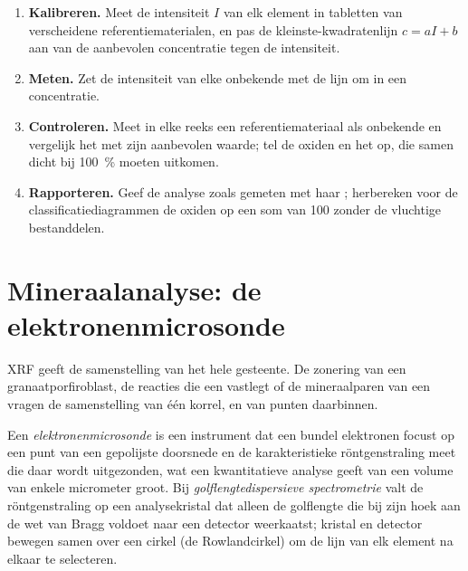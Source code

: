 \begin{method}\label{met:b2:field-lab-methods-2:calibration}
\begin{enumerate}
  \item \textbf{Kalibreren.} Meet de intensiteit $I$ van elk element in tabletten van verscheidene
        referentiematerialen, en pas de kleinste-kwadratenlijn $c = aI + b$ aan van de aanbevolen concentratie
        tegen de intensiteit.
  \item \textbf{Meten.} Zet de intensiteit van elke onbekende met de lijn om in een concentratie.
  \item \textbf{Controleren.} Meet in elke reeks een referentiemateriaal als onbekende en vergelijk het met
        zijn aanbevolen waarde; tel de oxiden en het  op, die samen dicht bij
        \qty{100}{\percent} moeten uitkomen.
  \item \textbf{Rapporteren.} Geef de analyse zoals gemeten met haar ; herbereken voor de
        classificatiediagrammen de oxiden op een som van 100 zonder de vluchtige bestanddelen.
\end{enumerate}
\end{method}

\section{Mineraalanalyse: de elektronenmicrosonde}\label{sec:b2:field-lab-methods-2:microprobe}

XRF geeft de samenstelling van het hele gesteente. De zonering van een granaatporfiroblast, de reacties
die een  vastlegt of de mineraalparen van een  vragen de samenstelling van één
korrel, en van punten daarbinnen.

\begin{definition}\label{def:b2:field-lab-methods-2:epma}
Een \emph{elektronenmicrosonde} is een instrument dat een bundel
elektronen focust op een punt van een gepolijste doorsnede en de karakteristieke röntgenstraling meet die daar wordt uitgezonden,
wat een kwantitatieve analyse geeft van een volume van enkele micrometer groot. Bij
\emph{golflengtedispersieve spectrometrie} valt de röntgenstraling
op een analysekristal dat alleen de golflengte die bij zijn hoek aan de wet van Bragg voldoet naar een detector
weerkaatst; kristal en detector bewegen samen over een cirkel (de Rowlandcirkel) om de lijn van elk
element na elkaar te selecteren.
\end{definition}

